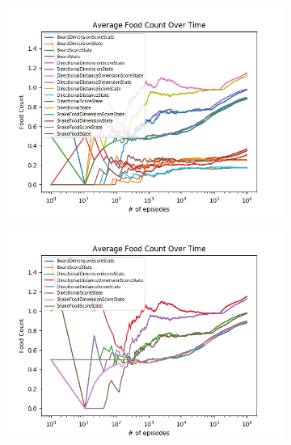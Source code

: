 \documentclass[result.tex]{subfiles}
\begin{document}
    \begin{figure}[ht]
        \centering
        \begin{subfigure}[b]{.35\linewidth}
            \includegraphics[width=\linewidth]{../images/expected_sarsa/state/234/all_average_food_count_over_time.png}
        \end{subfigure}
        \begin{subfigure}[b]{.35\linewidth}
            \includegraphics[width=\linewidth]{../images/expected_sarsa/state/234/score_dim_average_food_count_over_time.png}
        \end{subfigure}


\end{figure}
\end{document}
